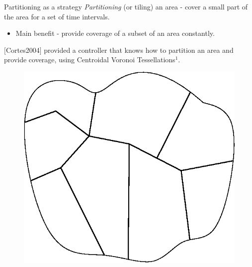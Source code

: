 \documentclass[t]{beamer}
\begin{document}
\begin{frame}[label=motivation12]{Partitioning as a strategy}
\emph{Partitioning} (or tiling) an area - cover a small part of the area for a set of time intervals.
\begin{itemize}
\item Main benefit - provide coverage of a subset of an area constantly.
\end{itemize}

$[$Cortes2004$]$ provided a controller that knows how to partition an area and provide coverage, using Centroidal Voronoi Tessellations$^1$.

\begin{figure}[b]
\includegraphics[scale=0.4]{motivation/partitioning.eps}
\end{figure}

\end{frame}

\end{document}
